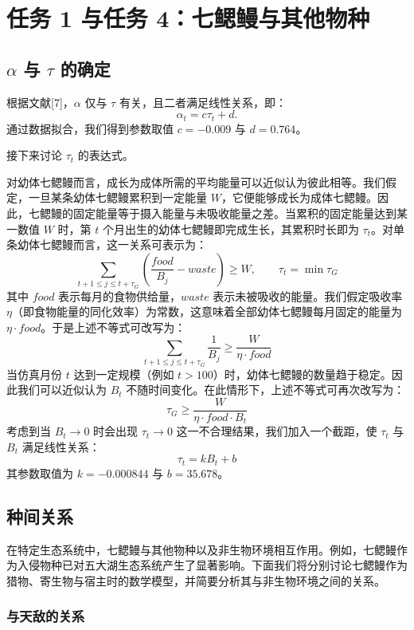\documentclass[11pt,a4paper]{ctexart}
\begin{document}
\section{任务 1 与任务 4：七鳃鳗与其他物种}

\subsection{$\alpha$ 与 $\tau$ 的确定}

根据文献[7]，$\alpha$ 仅与 $\tau$ 有关，且二者满足线性关系，即：
\[
\alpha_t=c\tau_t+d.
\]
通过数据拟合，我们得到参数取值 $c=-0.009$ 与 $d=0.764$。

接下来讨论 $\tau_t$ 的表达式。

对幼体七鳃鳗而言，成长为成体所需的平均能量可以近似认为彼此相等。我们假定，一旦某条幼体七鳃鳗累积到一定能量 $W$，它便能够成长为成体七鳃鳗。因此，七鳃鳗的固定能量等于摄入能量与未吸收能量之差。当累积的固定能量达到某一数值 $W$ 时，第 $t$ 个月出生的幼体七鳃鳗即完成生长，其累积时长即为 $\tau_t$。对单条幼体七鳃鳗而言，这一关系可表示为：
\[
\sum_{t+1\leqslant j\leqslant t+\tau_G}\left(\frac{food}{B_j}-waste\right)\geqslant W,\qquad \tau_t=\min\tau_G
\]
其中 $food$ 表示每月的食物供给量，$waste$ 表示未被吸收的能量。我们假定吸收率 $\eta$（即食物能量的同化效率）为常数，这意味着全部幼体七鳃鳗每月固定的能量为 $\eta\cdot food$。于是上述不等式可改写为：
\[
\sum_{t+1\leqslant j\leqslant t+\tau_G}\frac{1}{B_j}\geqslant\frac{W}{\eta\cdot food}
\]
当仿真月份 $t$ 达到一定规模（例如 $t>100$）时，幼体七鳃鳗的数量趋于稳定。因此我们可以近似认为 $B_t$ 不随时间变化。在此情形下，上述不等式可再次改写为：
\[
\tau_G\geqslant\frac{W}{\eta\cdot food\cdot B_t}
\]
考虑到当 $B_t\rightarrow 0$ 时会出现 $\tau_t\rightarrow 0$ 这一不合理结果，我们加入一个截距，使 $\tau_t$ 与 $B_t$ 满足线性关系：
\[
\tau_t=kB_t+b
\]
其参数取值为 $k=-0.000844$ 与 $b=35.678$。

\subsection{种间关系}

在特定生态系统中，七鳃鳗与其他物种以及非生物环境相互作用。例如，七鳃鳗作为入侵物种已对五大湖生态系统产生了显著影响。下面我们将分别讨论七鳃鳗作为猎物、寄生物与宿主时的数学模型，并简要分析其与非生物环境之间的关系。

\subsubsection{与天敌的关系}
\end{document}
